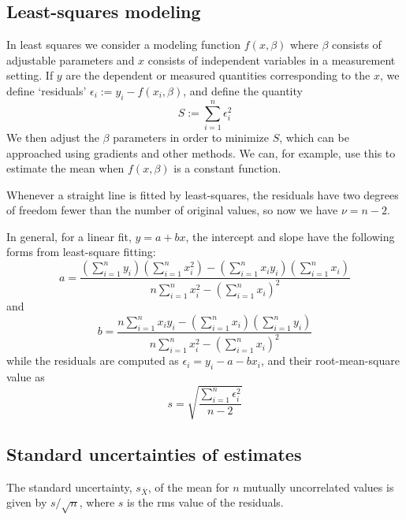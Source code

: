 \subsection{Least-squares modeling}

In least squares we consider a modeling function $f(x,\beta)$ where $\beta$ consists of adjustable parameters and $x$ consists of independent variables in a measurement setting. If $y$ are the dependent or measured quantities corresponding to the $x$, we define `residuals' $\epsilon_i := y_i - f(x_i,\beta)$, and define the quantity
\begin{equation}
    S := \sum_{i=1}^n\epsilon_i^2
\end{equation}
We then adjust the $\beta$ parameters in order to minimize $S$, which can be approached using gradients and other methods. We can, for example, use this to estimate the mean when $f(x,\beta)$ is a constant function. 


Whenever a straight line is fitted by least-squares, the residuals have two degrees of freedom fewer than the number of original values, so now we have $\nu = n-2$.


In general, for a linear fit, $y=a+bx$, the intercept and slope have the following forms from least-square fitting:
\begin{equation}
    a = \frac{\left(\sum_{i=1}^ny_i\right)\left(\sum_{i=1}^nx_i^2\right)-\left(\sum_{i=1}^nx_iy_i\right)\left(\sum_{i=1}^nx_i\right)}{n\sum_{i=1}^nx_i^2-\left(\sum_{i=1}^nx_i\right)^2}
\end{equation}
and
\begin{equation}
    b = \frac{n\sum_{i=1}^nx_iy_i-\left(\sum_{i=1}^nx_i\right)\left(\sum_{i=1}^ny_i\right)}{n\sum_{i=1}^nx_i^2-\left(\sum_{i=1}^nx_i\right)^2}
\end{equation}
while the residuals are computed as $\epsilon_i = y_i-a-bx_i$, and their root-mean-square value as
\begin{equation}
    s = \sqrt{\frac{\sum_{i=1}^n\epsilon_i^2}{n-2}}
\end{equation}


\subsection{Standard uncertainties of estimates}

The standard uncertainty, $s_{\overline{X}}$, of the mean for $n$ mutually uncorrelated values is given by $s/\sqrt{n}$, where $s$ is the rms value of the residuals.

